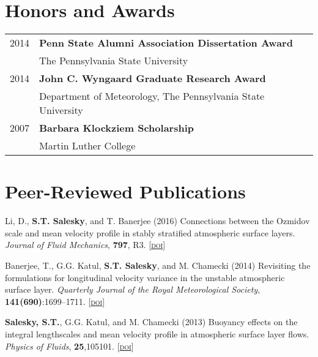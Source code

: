 \documentclass[11pt,letterpaper]{article}
\begin{document}
\section*{Honors and Awards} 
\begin{tabular}{l l}
2014 & \textbf{Penn State Alumni Association Dissertation Award} \\
     & The Pennsylvania State University \\[1.5\parskip]

2014 & \textbf{John C. Wyngaard Graduate Research Award} \\
     & Department of Meteorology, The Pennsylvania State University \\[1.5\parskip]

2007 & \textbf{Barbara Klockziem Scholarship} \\
     & Martin Luther College

\end{tabular}

\section*{Peer-Reviewed Publications} 

Li, D., \textbf{S.T. Salesky}, and T. Banerjee (2016) Connections between
the Ozmidov scale and mean velocity profile in stably stratified atmospheric
surface layers. \textit{Journal of Fluid Mechanics}, \textbf{797}, R3. [\href{http://doi.org/10.1017/jfm.2016.311}{\textsc{doi}}]

Banerjee, T., G.G. Katul, \textbf{S.T. Salesky}, and M. Chamecki (2014) Revisiting the formulations for longitudinal velocity variance in the unstable atmospheric surface layer. \textit{Quarterly Journal of the Royal Meteorological Society}, \textbf{141(690)}:1699--1711. [\href{http://doi.org/10.1002/qj.2472}{\textsc{doi}}] 

\textbf{Salesky, S.T.}, G.G. Katul, and M. Chamecki (2013) Buoyancy effects on the integral lengthscales and mean velocity profile in atmospheric surface layer flows. \textit{Physics of Fluids}, \textbf{25},105101. [\href{http://doi.org/10.1063/1.4823747}{\textsc{doi}}]
\end{document}
